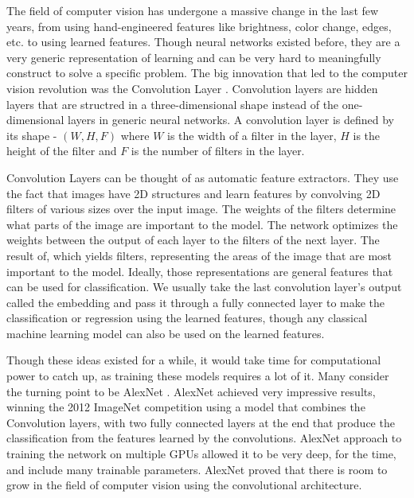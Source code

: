 \documentclass[../main.tex]{subfiles}
\begin{document}
The field of computer vision has undergone a massive change in the last few years, from using hand-engineered features like brightness,
color change, edges, etc. to using learned features. Though neural networks existed before,
they are a very generic representation of learning and can be very hard to meaningfully construct to solve a specific problem.
The big innovation that led to the computer vision revolution was the Convolution Layer \cite{originalcnn, understanding-cnn}.
Convolution layers are hidden layers that are structred in a three-dimensional shape instead of the one-dimensional layers in generic neural networks.
A convolution layer is defined by its shape - $(W,H,F)$ where $W$ is the width of a filter in the layer, $H$ is the height of the filter and 
$F$ is the number of filters in the layer.
\par

Convolution Layers can be thought of as automatic feature extractors. They use the fact that images have 2D structures and learn features by
convolving 2D filters of various sizes over the input image. The weights of the filters determine what parts of the image are important to the model. 
The network optimizes the weights between the output of each layer to the filters of the next layer. The result of, which yields filters,
representing the areas of the image that are most important to the model.
Ideally, those representations are general features that can be used for classification. We usually take the last convolution layer's output
called the embedding and pass it through a fully connected layer to make the classification or regression using the learned features,
though any classical machine learning model can also be used on the learned features. 
\par

Though these ideas existed for a while, it would take time for computational power to catch up, as training these models requires a lot of it.
Many consider the turning point to be AlexNet \cite{alexnet}. AlexNet achieved very impressive results, winning the 2012 ImageNet competition using a model that combines the Convolution layers,
with two fully connected layers at the end that produce the classification from the features learned by the convolutions.
AlexNet approach to training the network on multiple GPUs allowed it to be very deep, for the time, and include many trainable parameters.
AlexNet proved that there is room to grow in the field of computer vision using the convolutional architecture.
\par
\end{document}
